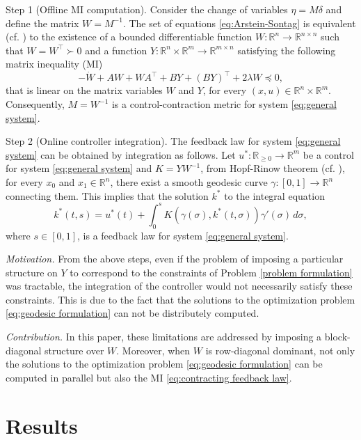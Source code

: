 \documentclass[10pt,twocolumn,twoside]{IEEEtran}
\theoremstyle{plain}
\theoremstyle{definition}
\theoremstyle{remark}
\begin{document}
Step 1 (Offline MI computation). Consider the change of variables $\eta=M\delta$ and define the matrix $W=M^{-1}$. The set of equations \eqref{eq:Arstein-Sontag} is equivalent (cf. \cite[Lemma 11.1]{CalafioreGhaoui2014}) to the existence of a bounded differentiable function $W:\mathbb{R}^n\to\mathbb{R}^{n\times n}$ such that $W=W^\top\succ0$ and a function $Y:\mathbb{R}^n\times\mathbb{R}^m\to\mathbb{R}^{m\times n}$ satisfying the following matrix inequality (MI)
\begin{equation}\label{eq:MI formulation}
	-\dot{W}+AW+WA^\top+BY+(BY)^\top+2\lambda W\preceq0,
\end{equation}
that is linear on the matrix variables $W$ and $Y$, for every $(x,u)\in\mathbb{R}^n\times\mathbb{R}^m$. Consequently, $M=W^{-1}$ is a control-contraction metric for system \eqref{eq:general system}.

Step 2 (Online controller integration). The feedback law for system \eqref{eq:general system} can be obtained by integration as follows. Let $u^\ast:\mathbb{R}_{\geq0}\to\mathbb{R}^m$ be a control for system \eqref{eq:general system} and $K=YW^{-1}$, from Hopf-Rinow theorem (cf. \cite[Theorem 7.7]{Boothby1986}), for every $x_0$ and $x_1\in\mathbb{R}^n$, there exist a smooth geodesic curve $\gamma:[0,1]\to\mathbb{R}^n$ connecting them. This implies that the solution $k^\ast$ to the integral equation
\begin{equation}\label{eq:contracting feedback law}
	k^\ast(t,s)=u^\ast(t)+\int_0^s K(\gamma(\sigma),k^\ast(t,\sigma))\gamma'(\sigma)\,d\sigma,
\end{equation}
where $s\in[0,1]$, is a feedback law for system \eqref{eq:general system}.

{\itshape Motivation.} From the above steps, even if the problem of imposing a particular structure on $Y$ to correspond to the constraints of Problem \ref{problem formulation} was tractable, the integration of the controller would not necessarily satisfy these constraints. This is due to the fact that the solutions to the optimization problem \eqref{eq:geodesic formulation} can not be distributely computed.

{\itshape Contribution.} In this paper, these limitations are addressed by imposing a block-diagonal structure over $W$. Moreover, when $W$ is row-diagonal dominant, not only the solutions to the optimization problem \eqref{eq:geodesic formulation} can be computed in parallel but also the MI \eqref{eq:contracting feedback law}.

\section{Results}\label{sec:Results}
\end{document}
